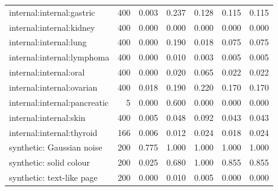 \begin{tabular}{@{}lrccccc@{}}
internal:internal:gastric & 400 & 0.003 & 0.237 & 0.128 & 0.115 & 0.115 \\
internal:internal:kidney & 400 & 0.000 & 0.000 & 0.000 & 0.000 & 0.000 \\
internal:internal:lung & 400 & 0.000 & 0.190 & 0.018 & 0.075 & 0.075 \\
internal:internal:lymphoma & 400 & 0.000 & 0.010 & 0.003 & 0.005 & 0.005 \\
internal:internal:oral & 400 & 0.000 & 0.020 & 0.065 & 0.022 & 0.022 \\
internal:internal:ovarian & 400 & 0.018 & 0.190 & 0.220 & 0.170 & 0.170 \\
internal:internal:pancreatic & 5 & 0.000 & 0.600 & 0.000 & 0.000 & 0.000 \\
internal:internal:skin & 400 & 0.005 & 0.048 & 0.092 & 0.043 & 0.043 \\
internal:internal:thyroid & 166 & 0.006 & 0.012 & 0.024 & 0.018 & 0.024 \\
synthetic: Gaussian noise & 200 & 0.775 & 1.000 & 1.000 & 1.000 & 1.000 \\
synthetic: solid colour & 200 & 0.025 & 0.680 & 1.000 & 0.855 & 0.855 \\
synthetic: text-like page & 200 & 0.000 & 0.010 & 0.005 & 0.000 & 0.000 \\
\bottomrule
\end{tabular}